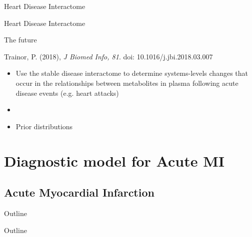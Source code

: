 \documentclass[xcolor=dvipsnames]{beamer}
\begin{document}
\begin{frame}{Heart Disease Interactome}
	\vspace{-10.5pt}
	\begin{center}
	\end{center}
\end{frame}

\begin{frame}{Heart Disease Interactome}
	\vspace{-10.5pt}
	\begin{center}
	\end{center}
\end{frame}

\begin{frame}{The future}
	\vspace{-15pt}
	\begin{center}
		
		Trainor, P. (2018), \emph{J Biomed Info, 81}. doi: 10.1016/j.jbi.2018.03.007 
	\end{center}
	\begin{itemize}
		\item Use the stable disease interactome to determine systems-levels changes that occur in the relationships between metabolites in plasma following acute disease events (e.g. heart attacks)
		\item[]
		\item Prior distributions 
	\end{itemize}
\end{frame}

\section{Diagnostic model for Acute MI}
\subsection{Acute Myocardial Infarction}
\begin{frame}{Outline}
	\vspace{-10.5pt}
	\tableofcontents[currentsection,subsectionstyle=hide]
\end{frame}

\begin{frame}{Outline}
	\vspace{-10.5pt}
	\tableofcontents[currentsection,subsectionstyle=show/shaded/hide]
\end{frame}
\end{document}
